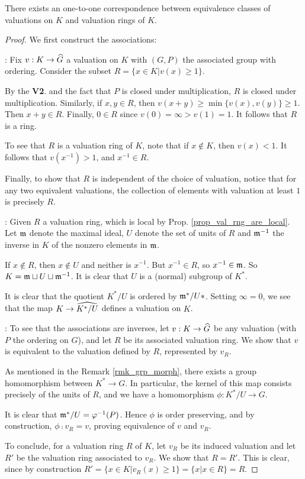 \begin{thm}\label{thm_valrng_eq_val}
There exists an one-to-one correspondence between equivalence 
classes of valuations on $K$ and valuation rings of $K$.
\end{thm}
\begin{proof}
We first construct the associations:

: Fix $v: K \to 
\widehat{G}$ a valuation on $K$ with $(G, P)$ the associated group 
with ordering. Consider the subset $R = \{x \in K | v(x) \geq 
1\}$. 

By the \textbf{V2}. and the fact that $P$ is closed under 
multiplication, $R$ is closed under multiplication. Similarly,
if $x, y \in R$, then $v(x + y) \geq \min\{v(x), v(y)\} \geq 1.$
Then $x + y \in R$. Finally, $0 \in R$ since $v(0) = \infty > 
v(1) = 1$. It follows that $R$ is a ring.

To see that $R$ is a valuation ring of $K$, note that if $x 
\notin K$, then $v(x) < 1$. It follows that $v(x^{-1}) > 1$, and 
$x^{-1} \in R$.

Finally, to show that $R$ is independent of the choice of valuation,
notice that for any two equivalent valuations, the collection of
elements with valuation at least $1$ is precisely $R$.

: Given $R$
a valuation ring, which is local by Prop. 
\ref{prop_val_rng_are_local}. Let $\mathfrak{m}$ denote the maximal
ideal, $U$ denote the set of units of $R$ and $\mathfrak{m}^{-1}$
the inverse in $K$ of the nonzero elements in $\mathfrak{m}$. 

If $x \notin R$, then $x \notin U$ and neither is $x^{-1}$. But 
$x^{-1} \in R$, so $x^{-1} \in \mathfrak{m}$. So $K = \mathfrak{m} \sqcup
U \sqcup \mathfrak{m}^{-1}$. It is clear that $U$ is a (normal) subgroup
of $K^*$. 

It is clear that the quotient $K^*/U$ is ordered by 
$\mathfrak{m}^{*}/U*$. Setting $\infty = 0$, we see that the map $K 
\to \widehat{K^*/U}$ defines a valuation on $K$.

: To see that the associations are inverses, 
let $v: K \to \widehat{G}$ be any valuation (with $P$ the ordering on 
$G$), and let $R$ be its associated valuation ring. We show that
$v$ is equivalent to the valuation defined by $R$, represented
by $v_R$.

As mentioned in the Remark \ref{rmk_grp_morph}, there exists a 
group homomorphism between $K^* \to G$. In particular, the 
kernel of this map consists precisely of the units of $R$, and we
have a homomorphism $\phi: K^*/U \to G$.

It is clear that $\mathfrak{m}^*/U = \varphi^{-1}(P)$. Hence $\phi$ is
order preserving, and by construction, $\phi \comp v_R = v$, 
proving equivalence of $v$ and $v_R$.

To conclude, for a valuation ring $R$ of $K$, let $v_R$ be its
induced valuation and let $R'$ be the valuation ring associated to
$v_R$. We show that $R = R'$. This is clear, since by construction
$R' = \{x \in K | v_R(x) \geq 1\} = \{x | x \in R\} = R.$
\end{proof}

